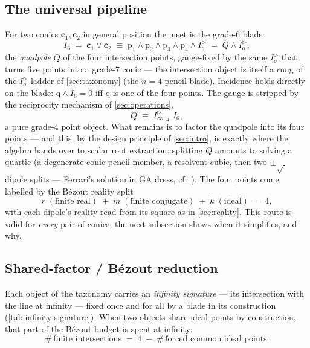\documentclass{birkjour}
\theoremstyle{definition}
\theoremstyle{remark}
\newcommand{\Iod}{I_o^{\triangleright}}      %
\newcommand{\Iinfd}{I_\infty^{\triangleright}}%
\newcommand{\meet}{\vee}
\newcommand{\joinp}{\wedge}
\begin{document}
\subsection{The universal pipeline}
\label{sec:pipeline}
For two conics $\mathbf{c}_1,\mathbf{c}_2$ in general position the meet is the
grade-$6$ blade
\begin{equation}\label{eq:I6}
  I_6 \;=\; \mathbf{c}_1\meet\mathbf{c}_2
  \;\equiv\; \mathrm{p}_1\joinp\mathrm{p}_2\joinp\mathrm{p}_3\joinp\mathrm{p}_4
             \joinp\Iod
  \;=\; Q\joinp\Iod ,
\end{equation}
the \emph{quadpole} $Q$ of the four intersection points, gauge-fixed by the
same $\Iod$ that turns five points into a grade-$7$ conic --- the
intersection object is itself a rung of the $\Iod$-ladder of
\cref{sec:taxonomy} (the $n=4$ pencil blade). Incidence holds directly on the
blade: $\mathrm{q}\joinp I_6 = 0$ iff $\mathrm{q}$ is one of the four points.
The gauge is stripped by the reciprocity mechanism of \cref{sec:operations},
\begin{equation}\label{eq:quadpole-recovery}
  Q \;\equiv\; \Iinfd \lrcorner\, I_6 ,
\end{equation}
a pure grade-$4$ point object. What remains is to factor the quadpole into
its four points --- and this, by the design principle of \cref{sec:intro}, is
exactly where the algebra hands over to scalar root extraction: splitting
$Q$ amounts to solving a quartic (a degenerate-conic pencil member, a
resolvent cubic, then two $\pm\sqrt{\ }$ dipole splits --- Ferrari's solution
in GA dress, cf.~\cite{faucette_geometric_1996}). The four points come
labelled by the B\'ezout reality split
\begin{equation}\label{eq:reality-split}
  r \;(\text{finite real}) \;+\; m \;(\text{finite conjugate}) \;+\;
  k \;(\text{ideal}) \;=\; 4 ,
\end{equation}
with each dipole's reality read from its square as in \cref{sec:reality}.
This route is valid for \emph{every} pair of conics; the next subsection
shows when it simplifies, and why.

\subsection{Shared-factor / B\'ezout reduction}
\label{sec:bezout-reduction}
Each object of the taxonomy carries an \emph{infinity signature} --- its
intersection with the line at infinity --- fixed once and for all by a blade
in its construction (\cref{tab:infinity-signature}). When two objects share
ideal points by construction, that part of the B\'ezout budget is spent at
infinity:
\begin{equation}\label{eq:shared-factor}
  \#\,\text{finite intersections} \;=\; 4 \;-\;
  \#\,\text{forced common ideal points}.
\end{equation}
\end{document}
